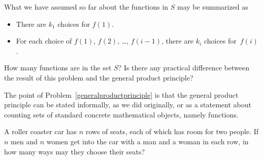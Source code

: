 What we have assumed so far about the functions in $S$ may be
summarized as
\begin{itemize}
\item There are $k_1$ choices for $f(1)$.
\item For each choice of $f(1)$, $f(2)$, \ldots, $f(i-1)$, there are $k_i$
choices for~$f(i)$.
\end{itemize}  How many functions are in the set
$S$? Is there any practical difference between the result of this
problem and the general product principle?\label{generalproductprinciple}      
\ep

The point of Problem~\ref{generalproductprinciple} is that the general
product principle can be stated informally, as we did originally, or
as a statement about counting sets of standard concrete mathematical
objects, namely functions.

\bp
\itemi  A roller coaster car has $n$ rows of seats, each of which
has room for two people.  If $n$ men and $n$ women get into the car with a
man and a woman in each row,  in how many ways may they choose their seats?



